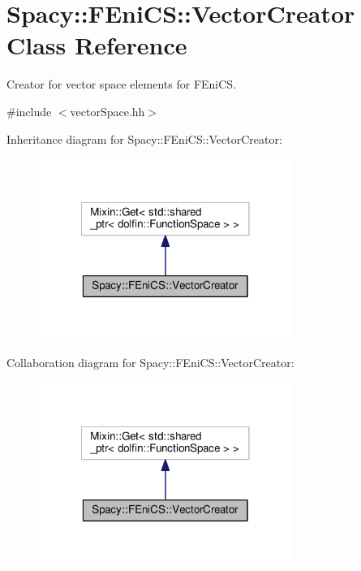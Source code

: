 \hypertarget{classSpacy_1_1FEniCS_1_1VectorCreator}{\section{Spacy\-:\-:F\-Eni\-C\-S\-:\-:Vector\-Creator Class Reference}
\label{classSpacy_1_1FEniCS_1_1VectorCreator}
}


Creator for vector space elements for F\-Eni\-C\-S.  




{\ttfamily \#include $<$vector\-Space.\-hh$>$}



Inheritance diagram for Spacy\-:\-:F\-Eni\-C\-S\-:\-:Vector\-Creator\-:
\nopagebreak
\begin{figure}[H]
\begin{center}
\leavevmode
\includegraphics[width=234pt]{classSpacy_1_1FEniCS_1_1VectorCreator__inherit__graph}
\end{center}
\end{figure}


Collaboration diagram for Spacy\-:\-:F\-Eni\-C\-S\-:\-:Vector\-Creator\-:
\nopagebreak
\begin{figure}[H]
\begin{center}
\leavevmode
\includegraphics[width=234pt]{classSpacy_1_1FEniCS_1_1VectorCreator__coll__graph}
\end{center}
\end{figure}
